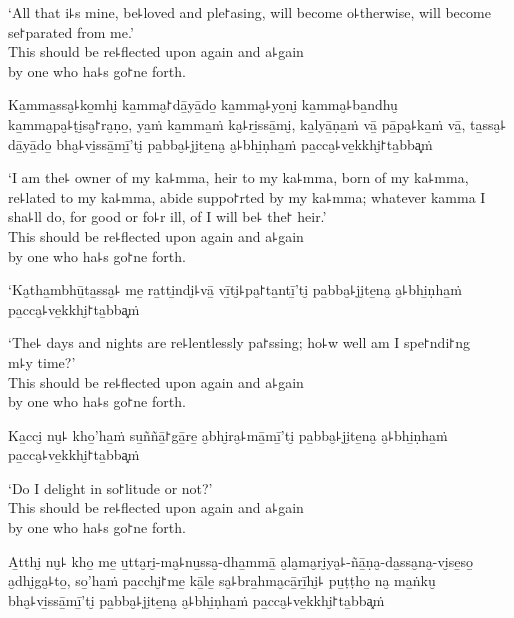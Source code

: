 \begin{english}
  `All that i꜕s mine, be꜕loved and ple꜓asing, will become o꜕therwise, will become se꜓parated from me.'\\
  This should be re꜕flected upon again and a꜕gain\\
  by one who ha꜕s go꜓ne forth.
\end{english}

Ka̱mma̱ssa̮꜕ko̱mhi̮ ka̱mma̮꜓dā̱yā̱do̱ ka̱mma̮꜕yo̱ni̮ ka̱mma̮꜕ba̱ndhu̮ ka̱mma̮pa̮꜕ṭi̮sa̮꜓ra̮ṇo̱, ya̱ṁ ka̱mma̱ṁ ka̮꜕ri̱ssā̱mi̮, ka̱lyā̱ṇa̱ṁ vā̱ pā̱pa̮꜕ka̱ṁ vā̱, ta̱ssa̮꜕ dā̱yā̱do̱ bha̮꜕vi̱ssā̱mī̱'ti̮ pa̱bba̮꜕ji̮te̱na̮ a̮꜕bhi̱ṇha̱ṁ pa̱cca̮꜕ve̱kkhi̮꜓ta̱bba͓ṁ

\begin{english}
  `I am the꜕ owner of my ka꜕mma, heir to my ka꜕mma, born of my ka꜕mma,\\
  re꜕lated to my ka꜕mma, abide suppo꜓rted by my ka꜕mma; whatever kamma I sha꜕ll do, for good or fo꜕r ill, of  I will be꜕ the꜓ heir.'\\
  This should be re꜕flected upon again and a꜕gain\\
  by one who ha꜕s go꜓ne forth.
\end{english}

\clearpage

`Ka̮tha̱mbhū̱ta̱ssa̮꜕ me̱ ra̱tti̱ndi̮꜕vā̱ vī̱ti̮꜕pa̮꜓ta̱ntī̱'ti̮ pa̱bba̮꜕ji̮te̱na̮ a̮꜕bhi̱ṇha̱ṁ pa̱cca̮꜕ve̱kkhi̮꜓ta̱bba͓ṁ

\begin{english}
  `The꜕ days and nights are re꜕lentlessly pa꜓ssing; ho꜕w well am I spe꜓ndi꜓ng\\ m꜕y time?'\\
  This should be re꜕flected upon again and a꜕gain\\
  by one who ha꜕s go꜓ne forth.
\end{english}

Ka̱cci̮ nu̮꜕ kho̱'ha̱ṁ su̱ññā̱꜓gā̱re̱ a̮bhi̮ra̮꜕mā̱mī̱'ti̮ pa̱bba̮꜕ji̮te̱na̮ a̮꜕bhi̱ṇha̱ṁ pa̱cca̮꜕ve̱kkhi̮꜓ta̱bba͓ṁ

\begin{english}
  `Do I delight in so꜓litude or not?'\\
  This should be re꜕flected upon again and a꜕gain\\
  by one who ha꜕s go꜓ne forth.
\end{english}

A̱tthi̮ nu̮꜕ kho̱ me̱ u̱tta̮ri̮-ma̮꜕nu̱ssa̮-dha̱mmā̱ a̮la̮ma̮ri̮ya̮꜕-ñā̱ṇa̮-da̱ssa̮na̮-vi̮se̱so̱ a̮dhi̮ga̮꜕to̱, so̱'ha̱ṁ pa̱cchi̮꜓me̱ kā̱le̱ sa̮꜕bra̱hma̮cā̱rī̱hi̮꜕ pu̱ṭṭho̱ na̮ ma̱ṅku̮ bha̮꜕vi̱ssā̱mī̱'ti̮ pa̱bba̮꜕ji̮te̱na̮ a̮꜕bhi̱ṇha̱ṁ pa̱cca̮꜕ve̱kkhi̮꜓ta̱bba͓ṁ

